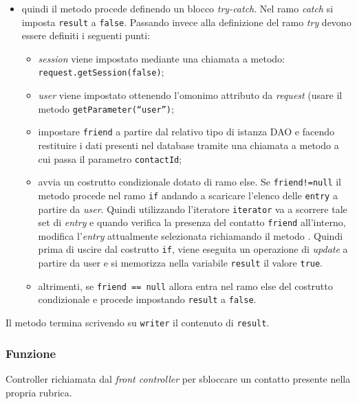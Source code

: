 \begin{description}
\begin{itemize}
		\item quindi il metodo procede definendo un blocco \textit{try-catch}. Nel ramo \textit{catch} si imposta \texttt{result} a \texttt{false}. Passando invece alla definizione del ramo \textit{try} devono essere definiti i seguenti punti:
		\begin{itemize}
			\item \textit{session} viene impostato mediante una chiamata a metodo:
			\verb|request.getSession(false)|;
			\item \textit{user} viene impostato ottenendo l'omonimo attributo da \textit{request} (usare il metodo \texttt{getParameter(``user'')};
			\item impostare  \texttt{friend} a partire dal relativo tipo di istanza DAO e facendo restituire i dati presenti nel database tramite una chiamata a metodo  a cui passa il parametro \texttt{contactId};
			\item avvia un costrutto condizionale dotato di ramo else. Se \texttt{friend!=null} il metodo procede nel ramo \texttt{if} andando a scaricare l'elenco delle \texttt{entry} a partire da \textit{user}. Quindi utilizzando l'iteratore \texttt{iterator} va a scorrere tale set di \textit{entry} e quando verifica la presenza del contatto \texttt{friend} all'interno, modifica l'\textit{entry} attualmente selezionata richiamando il metodo . Quindi prima di uscire dal costrutto \texttt{if}, viene eseguita un operazione di \textit{update} a partire da user e si memorizza nella variabile \texttt{result} il valore \texttt{true}.
			\item altrimenti, se \texttt{friend == null} allora entra nel ramo else del costrutto condizionale e procede impostando \texttt{result} a \texttt{false}.
		\end{itemize}
	\end{itemize}
	Il metodo termina scrivendo su \texttt{writer} il contenuto di \texttt{result}.
	
\end{description}



\subsubsection*{Funzione}
Controller richiamata dal \textit{front controller} per sbloccare un contatto presente nella propria rubrica.

